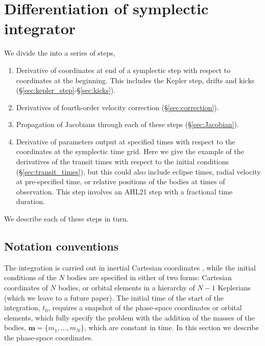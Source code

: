 \documentclass[fleqn,usenatbib,twocolumn]{mnras}
\newcommand   {\change}[1] {{\color{black}{#1}}}
\begin{document}
\section{Differentiation of symplectic integrator} \label{sec:differentiation_symplectic}

We divide the \change{differentiation of algorithm \ref{alg:AHL21_algorithm}} into a series of steps,
\begin{enumerate}
    \item Derivative of coordinates at end of a symplectic step with respect
    to coordinates at the beginning.  This includes the Kepler step, drifts
    and kicks (\S \ref{sec:kepler_step}-\S \ref{sec:kicks}).
    \item Derivatives of fourth-order velocity correction (\S \ref{sec:correction}).
    \item Propagation of Jacobians through each of these steps (\S \ref{sec:Jacobian}).
    \item Derivative of parameters output at specified times with respect
    to the coordinates at the symplectic time grid. Here we give the example
    of the derivatives of the transit times with respect to the initial conditions
    (\S \ref{sec:transit_times}), but
    this could also include eclipse times, radial velocity at pre-specified time,
    or relative positions of the bodies at times of observation.   This step
    involves an {\sc AHL21} step with a fractional time duration.
\end{enumerate}

We describe
each of these steps in turn\change{, after some preliminaries}.

\subsection{Notation conventions} \label{sec:notation}

The integration is carried out in inertial Cartesian coordinates \citep{Hernandez2015},
while the initial conditions of the $N$ bodies are specified in either of two forms:
Cartesian coordinates of $N$ bodies, or orbital elements in a hierarchy of $N-1$
Keplerians (which we leave to a future paper).  The initial time of the start of
the integration, $t_0$, requires
a snapshot of the phase-space coordinates or orbital elements, which fully
specify the problem with the addition of the masses of the bodies,
$\mathbf{m} = \{m_1,...,m_N\}$, which are constant in time. In this section we
describe the phase-space coordinates.
\end{document}
